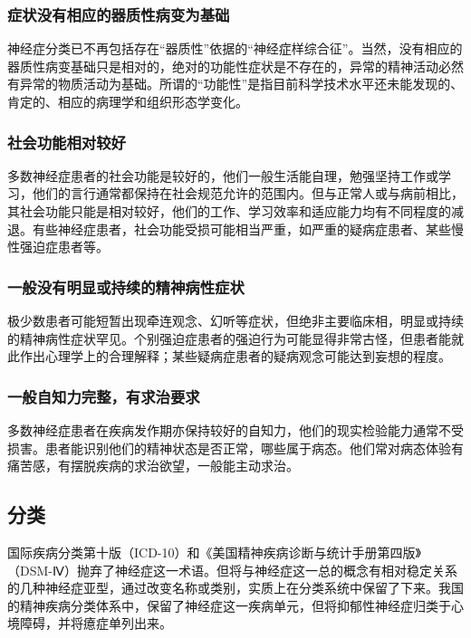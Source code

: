 \subsubsection{症状没有相应的器质性病变为基础}

神经症分类已不再包括存在“器质性”依据的“神经症样综合征”。当然，没有相应的器质性病变基础只是相对的，绝对的功能性症状是不存在的，异常的精神活动必然有异常的物质活动为基础。所谓的“功能性”是指目前科学技术水平还未能发现的、肯定的、相应的病理学和组织形态学变化。

\subsubsection{社会功能相对较好}

多数神经症患者的社会功能是较好的，他们一般生活能自理，勉强坚持工作或学习，他们的言行通常都保持在社会规范允许的范围内。但与正常人或与病前相比，其社会功能只能是相对较好，他们的工作、学习效率和适应能力均有不同程度的减退。有些神经症患者，社会功能受损可能相当严重，如严重的疑病症患者、某些慢性强迫症患者等。

\subsubsection{一般没有明显或持续的精神病性症状}

极少数患者可能短暂出现牵连观念、幻听等症状，但绝非主要临床相，明显或持续的精神病性症状罕见。个别强迫症患者的强迫行为可能显得非常古怪，但患者能就此作出心理学上的合理解释；某些疑病症患者的疑病观念可能达到妄想的程度。

\subsubsection{一般自知力完整，有求治要求}

多数神经症患者在疾病发作期亦保持较好的自知力，他们的现实检验能力通常不受损害。患者能识别他们的精神状态是否正常，哪些属于病态。他们常对病态体验有痛苦感，有摆脱疾病的求治欲望，一般能主动求治。

\subsection{分类}

国际疾病分类第十版（ICD-10）和《美国精神疾病诊断与统计手册第四版》（DSM-Ⅳ）抛弃了神经症这一术语。但将与神经症这一总的概念有相对稳定关系的几种神经症亚型，通过改变名称或类别，实质上在分类系统中保留了下来。我国的精神疾病分类体系中，保留了神经症这一疾病单元，但将抑郁性神经症归类于心境障碍，并将癔症单列出来。

